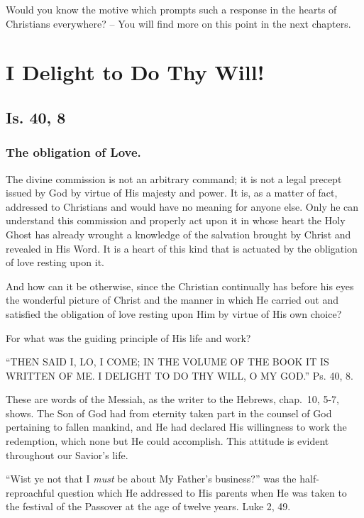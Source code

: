 \documentclass[
]{book}
\begin{document}
Would you know the motive which prompts such a response in the hearts of Christians everywhere? -- You will find more on this point in the next chapters.

\hypertarget{i-delight-to-do-thy-will}{%
\chapter{I Delight to Do Thy Will!}\label{i-delight-to-do-thy-will}}

\hypertarget{is.-40-8}{%
\section*{Is. 40, 8}\label{is.-40-8}}

\hypertarget{the-obligation-of-love.}{%
\subsection*{The obligation of Love.}\label{the-obligation-of-love.}}

The divine commission is not an arbitrary command; it is not a legal precept issued by God by virtue of His majesty and power. It is, as a matter of fact, addressed to Christians and would have no meaning for anyone else. Only he can understand this commission and properly act upon it in whose heart the Holy Ghost has already wrought a knowledge of the salvation brought by Christ and revealed in His Word. It is a heart of this kind that is actuated by the obligation of love resting upon it.

And how can it be otherwise, since the Christian continually has before his eyes the wonderful picture of Christ and the manner in which He carried out and satisfied the obligation of love resting upon Him by virtue of His own choice?

For what was the guiding principle of His life and work?

``THEN SAID I, LO, I COME; IN THE VOLUME OF THE BOOK IT IS WRITTEN OF ME. I DELIGHT TO DO THY WILL, O MY GOD.'' Ps. 40, 8.

These are words of the Messiah, as the writer to the Hebrews, chap.~10, 5-7, shows. The Son of God had from eternity taken part in the counsel of God pertaining to fallen mankind, and He had declared His willingness to work the redemption, which none but He could accomplish. This attitude is evident throughout our Savior's life.

``Wist ye not that I \emph{must} be about My Father's business?'' was the half-reproachful question which He addressed to His parents when He was taken to the festival of the Passover at the age of twelve years. Luke 2, 49.
\end{document}
